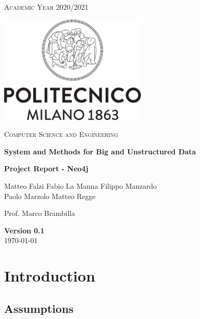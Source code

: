 \documentclass[table, 12pt]{article}
\begin{document}
\begin{titlepage}
    \centering
    \vspace{2cm}
    \scshape\large Academic Year 2020/2021 \par
    \vfill
    \includegraphics[width=200pt]{images/LogoPoliMI}\par\vspace{1cm}
    {\scshape\LARGE Computer Science and Engineering \par}
    \vspace{1.5cm}
    {\Large\bfseries System and Methods for Big and Unstructured Data \par}
    \vspace{0.5cm}
    {\huge\bfseries \textbf{Project Report - Neo4j} \par}
    \vspace{2cm}
    {\large{Matteo Falzi \quad Fabio La Manna \quad Filippo Manzardo \\Paolo Marzolo \quad Matteo Regge}\par}
    \vfill
    {\large Prof. Marco Brambilla }
    \vfill
    {\large \textbf{Version 0.1}\\ \today \par}
\end{titlepage}
\thispagestyle{plain}
\mbox{}


\section{Introduction}

\subsection{Assumptions}

\end{document}
